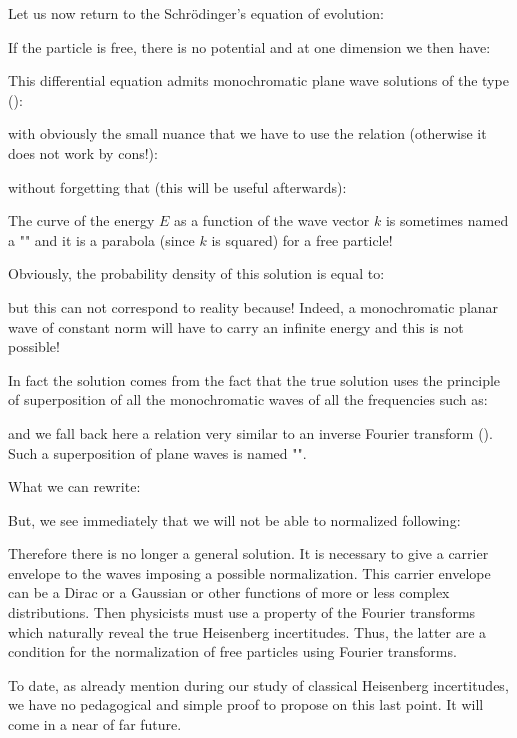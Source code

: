 	Let us now return to the Schrödinger's equation of evolution:
	
	If the particle is free, there is no potential and at one dimension we then have:
	
	This differential equation admits monochromatic plane wave solutions of the type ():
	
	with obviously the small nuance that we have to use the relation (otherwise it does not work by cons!):
	
	without forgetting that (this will be useful afterwards):
	
	The curve of the energy $E$ as a function of the wave vector $k$ is sometimes named a "" and it is a parabola (since $k$ is squared) for a free particle!

	Obviously, the probability density of this solution is equal to:
	
	but this can not correspond to reality because! Indeed, a monochromatic planar wave of constant norm will have to carry an infinite energy and this is not possible!

	In fact the solution comes from the fact that the true solution uses the principle of superposition of all the monochromatic waves of all the frequencies such as:
	
	and we fall back here a relation very similar to an inverse Fourier transform (). Such a superposition of plane waves is named "".
	
	What we can rewrite:
	
	But, we see immediately that we will not be able to normalized following:
	
	Therefore there is no longer a general solution. It is necessary to give a carrier envelope to the waves imposing a possible normalization. This carrier envelope can be a Dirac or a Gaussian or other functions of more or less complex distributions. Then physicists must use a property of the Fourier transforms which naturally reveal the true Heisenberg incertitudes. Thus, the latter are a condition for the normalization of free particles using Fourier transforms.

	To date, as already mention during our study of classical Heisenberg incertitudes, we have no pedagogical and simple proof to propose on this last point. It will come in a near of far future.

